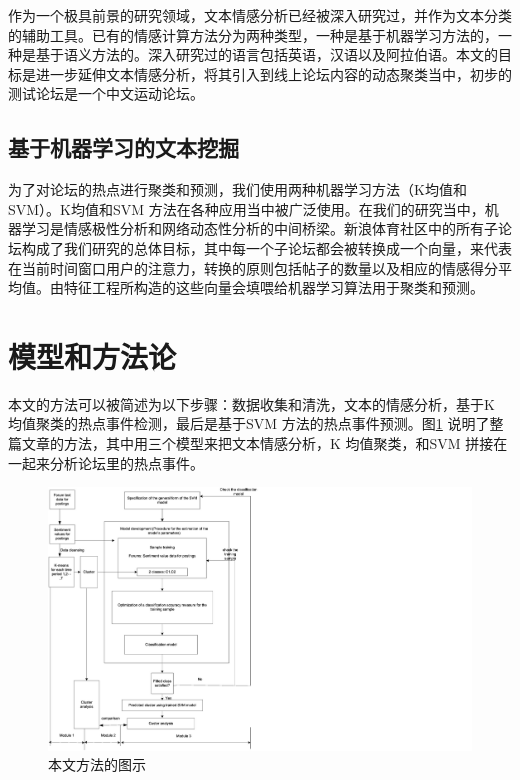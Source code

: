 \documentclass{ctexart}
\begin{document}
            作为一个极具前景的研究领域，文本情感分析已经被深入研究过，并作为文本分类的辅助工具。已有的情感计算方法分为两种类型，一种是基于机器学习方法的，一种是基于语义方法的。深入研究过的语言包括英语，汉语以及阿拉伯语。本文的目标是进一步延伸文本情感分析，将其引入到线上论坛内容的动态聚类当中，初步的测试论坛是一个中文运动论坛。

        \subsection{基于机器学习的文本挖掘}
            为了对论坛的热点进行聚类和预测，我们使用两种机器学习方法（K均值和SVM）。K均值和SVM 方法在各种应用当中被广泛使用。在我们的研究当中，机器学习是情感极性分析和网络动态性分析的中间桥梁。新浪体育社区中的所有子论坛构成了我们研究的总体目标，其中每一个子论坛都会被转换成一个向量，来代表在当前时间窗口用户的注意力，转换的原则包括帖子的数量以及相应的情感得分平均值。由特征工程所构造的这些向量会填喂给机器学习算法用于聚类和预测。

    \section{模型和方法论}
        本文的方法可以被简述为以下步骤：数据收集和清洗，文本的情感分析，基于K 均值聚类的热点事件检测，最后是基于SVM 方法的热点事件预测。图\ref{fig_1} 说明了整篇文章的方法，其中用三个模型来把文本情感分析，K 均值聚类，和SVM 拼接在一起来分析论坛里的热点事件。
        \begin{figure}[hb]
            \centering
            \includegraphics[width=1.1\textwidth]{fig_1}
            \caption{本文方法的图示}
            \label{fig_1}
        \end{figure}
\end{document}
